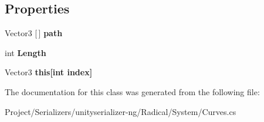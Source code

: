 \subsection*{Properties}
\begin{DoxyCompactItemize}
\item 
\mbox{\label{class_radical_library_1_1_spline_1_1_path_a30b8ec768fb58165f56d040384cc1e0e}} 
Vector3 \mbox{[}$\,$\mbox{]} {\bfseries path}
\item 
\mbox{\label{class_radical_library_1_1_spline_1_1_path_aedc28e4d2345dea1512425cc2438e82d}} 
int {\bfseries Length}
\item 
\mbox{\label{class_radical_library_1_1_spline_1_1_path_a505ac35b3086ec5b8117259ecef2ee1e}} 
Vector3 {\bfseries this\mbox{[}int index\mbox{]}}
\end{DoxyCompactItemize}


The documentation for this class was generated from the following file\+:\begin{DoxyCompactItemize}
\item 
Project/\+Serializers/unityserializer-\/ng/\+Radical/\+System/Curves.\+cs\end{DoxyCompactItemize}
